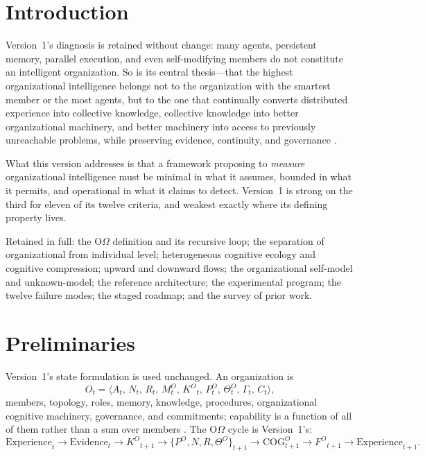 \documentclass[11pt]{article}
\newcommand{\OOm}{\ensuremath{\mathrm{O}\Omega}}
\newcommand{\Ko}{\ensuremath{K^O}}
\newcommand{\Fo}{\ensuremath{F^O}}
\begin{document}
\tableofcontents
\bigskip

\section{Introduction}

Version~1's diagnosis is retained without change: many agents, persistent memory, parallel execution, and even self-modifying members do not constitute an intelligent organization. So is its central thesis---that the highest organizational intelligence belongs not to the organization with the smartest member or the most agents, but to the one that continually converts distributed experience into collective knowledge, collective knowledge into better organizational machinery, and better machinery into access to previously unreachable problems, while preserving evidence, continuity, and governance \citep{yang2026oomega}.

What this version addresses is that a framework proposing to \emph{measure} organizational intelligence must be minimal in what it assumes, bounded in what it permits, and operational in what it claims to detect. Version~1 is strong on the third for eleven of its twelve criteria, and weakest exactly where its defining property lives.

Retained in full: the \OOm{} definition and its recursive loop; the separation of organizational from individual level; heterogeneous cognitive ecology and cognitive compression; upward and downward flows; the organizational self-model and unknown-model; the reference architecture; the experimental program; the twelve failure modes; the staged roadmap; and the survey of prior work.

\section{Preliminaries}

Version~1's state formulation is used unchanged. An organization is
\[
O_t = \langle A_t,\, N_t,\, R_t,\, M^O_t,\, \Ko_t,\, P^O_t,\, \Theta^O_t,\, \Gamma_t,\, C_t \rangle,
\]
members, topology, roles, memory, knowledge, procedures, organizational cognitive machinery, governance, and commitments; capability is a function of all of them rather than a sum over members \citep{cyert1963behavioral,hutchins1995cognition}. The \OOm{} cycle is Version~1's:
\[
\text{Experience}_t \to \text{Evidence}_t \to \Ko_{t+1} \to \{P^O, N, R, \Theta^O\}_{t+1} \to \text{COG}^O_{t+1} \to \Fo_{t+1} \to \text{Experience}_{t+1}.
\]
\end{document}
